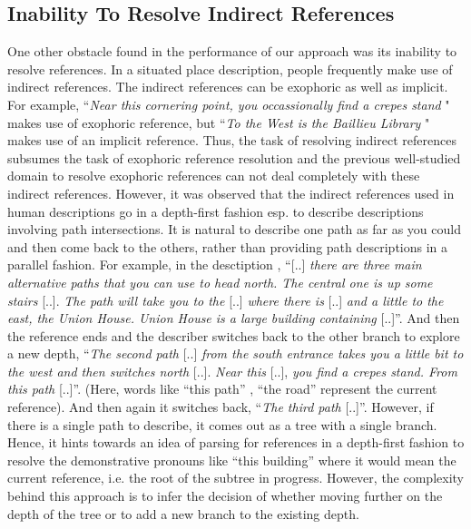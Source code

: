 \documentclass{acm_proc_article-sp}
\begin{document}
\subsection{Inability To Resolve Indirect References}
One other obstacle found in the performance of our approach was its inability to resolve references.
In a situated place description, people frequently make use of indirect references. The 
indirect references can be exophoric as well as implicit. For example, ``\textit{Near this cornering point, you occassionally find a crepes stand} "
 makes use of exophoric reference, but ``\textit{To the West is the Baillieu Library} " makes use of an implicit reference. Thus,
the task of resolving indirect references subsumes the task of exophoric reference resolution and 
the previous well-studied domain to resolve exophoric references can not deal completely with these indirect references.
However, it was observed that the indirect references used in human descriptions go in a
depth-first fashion esp. to describe descriptions involving path intersections. It is natural to
describe one path as far as you could and then come back to the others,
rather than providing path descriptions in a parallel fashion. For
example, in the desctiption , ``{[}..{]} \textit{there are three main
alternative paths that you can use to head north. The central one is up
some stairs} {[}..{]}. \textit{The path will take you to the} {[}..{]} \textit{where there
is} {[}..{]} \textit{and a little to the east, the Union House. Union House is a
large building containing} {[}..{]}''. And then the reference ends and the
describer switches back to the other branch to explore a new depth,
``\textit{The second path} {[}..{]} \textit{from the south entrance takes you a little
bit to the west and then switches north} {[}..{]}. \textit{Near this} {[}..{]},
\textit{you find a crepes stand. From this path }{[}..{]}''. (Here, words like
``this path'' , ``the road'' represent the current reference). And then
again it switches back, ``\textit{The third path} {[}..{]}''. 
However, if there is a single path to describe, it comes out as a tree with a single branch.
Hence, it hints towards an idea of parsing for references in a depth-first fashion 
to resolve the demonstrative pronouns like ``this building'' where it would
mean the current reference, i.e. the root of the subtree in progress. 
However, the complexity behind this approach is to infer the decision of whether moving further on the depth
of the tree or to add a new branch to the existing depth. 
\end{document}
